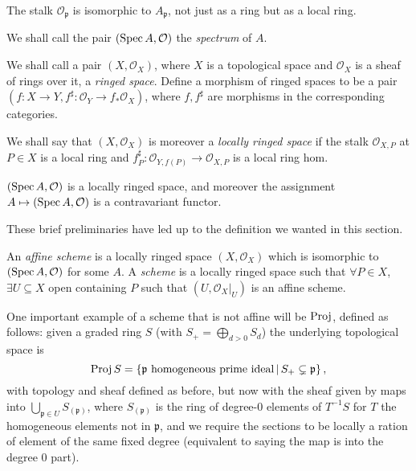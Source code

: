 \documentclass[000-main.tex]{subfiles}
\begin{document}
\begin{lemma}
  The stalk $\mathcal{O}_{\mathfrak{p}}$ is isomorphic to $A_{\mathfrak{p}}$, not just as a ring but as a local ring.
\end{lemma}

We shall call the pair $(\operatorname{Spec} A, \mathcal{O})$ the \emph{spectrum} of $A$. 

\begin{definition}
  We shall call a pair $(X, \mathcal{O}_X)$, where $X$ is a topological space and $\mathcal{O}_X$ is a sheaf of rings over it, a \emph{ringed space}.
  Define a morphism of ringed spaces to be a pair $(f : X \to Y, f^\sharp : \mathcal{O}_Y \to f_\ast \mathcal{O}_X)$, where $f, f^\sharp$ are morphisms in the corresponding categories.

  We shall say that $(X, \mathcal{O}_X)$ is moreover a \emph{locally ringed space} if the stalk $\mathcal{O}_{X, P}$ at $P \in X$ is a local ring and $f^\sharp_P : \mathcal{O}_{Y, f(P)} \to \mathcal{O}_{X, P}$ is a local ring hom.
\end{definition}

\begin{example}
  $(\operatorname{Spec} A, \mathcal{O})$ is a locally ringed space, and moreover the assignment $A \mapsto (\operatorname{Spec} A , \mathcal{O})$ is a contravariant functor.
\end{example}

These brief preliminaries have led up to the definition we wanted in this section. 

\begin{definition}
  An \emph{affine scheme} is a locally ringed space $(X, \mathcal{O}_X)$ which is isomorphic to $(\operatorname{Spec} A, \mathcal{O})$ for some $A$.
  A \emph{scheme} is a locally ringed space such that $\forall P \in X$, $\exists U \subseteq X$ open containing $P$ such that $(U, \left . \mathcal{O}_X \right \rvert_{U})$ is an affine scheme.
\end{definition}

\begin{example}
\end{example}

One important example of a scheme that is not affine will be $\operatorname{Proj}$, defined as follows: given a graded ring $S$ (with $S_+ = \bigoplus_{d > 0 } S_d$) the underlying topological space is 
\[
  \operatorname{Proj} S = \left \lbrace \mathfrak{p} \text{ homogeneous prime ideal} \, | \, S_+ \subsetneq \mathfrak{p} \right \rbrace ,
\] 
with topology and sheaf defined as before, but now with the sheaf given by maps into $\bigcup_{\mathfrak{p} \in U} S_{(\mathfrak{p})}$, where $S_{(\mathfrak{p})}$ is the ring of degree-0 elements of $T^{-1}S$ for $T$ the homogeneous elements not in $\mathfrak{p}$, and we require the sections to be locally a ration of element of the same fixed degree (equivalent to saying the map is into the degree 0 part). 

\end{document}
